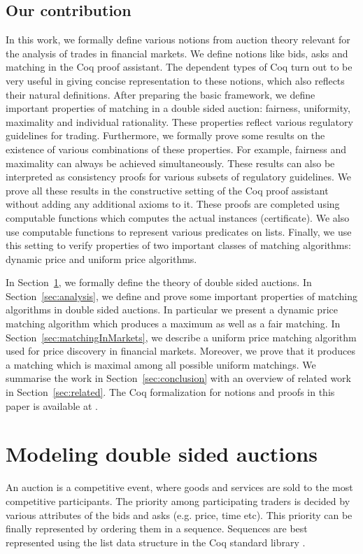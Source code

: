 \documentclass[a4paper,UKenglish,cleveref, autoref]{lipics-v2019}
\begin{document}
\subsection{Our contribution}

In this work, we formally define various notions from auction theory relevant for the analysis of trades in financial markets. We define notions like bids, asks and matching in the Coq proof assistant. The dependent types of Coq turn out to be very useful in giving concise representation to these notions, which also reflects their natural definitions. After preparing the basic framework, we define important properties of matching in a double sided auction: fairness, uniformity, maximality and individual rationality. These properties reflect various regulatory guidelines for trading. Furthermore, we formally prove some results on the existence of various combinations of these properties. For example, fairness and maximality can always be achieved simultaneously. These results can also be interpreted as consistency proofs for various subsets of regulatory guidelines. We prove all these results in the constructive setting of the Coq proof assistant without adding any additional axioms to it. These proofs are completed using computable functions which computes the actual instances (certificate). We also use computable functions to represent various predicates on lists. Finally, we use this setting to verify properties of two important classes of matching algorithms: dynamic price and uniform price algorithms. 

In Section~\ref{sec:modeling}, we formally define the theory of double sided auctions. In Section~\ref{sec:analysis}, we define and prove some important properties of matching algorithms in double sided auctions. In particular we present a dynamic price matching algorithm which produces a maximum as well as a fair matching. In Section~\ref{sec:matchingInMarkets}, we describe a uniform price matching algorithm used for price discovery in financial markets. Moreover, we prove that it produces a matching which is maximal among all possible uniform matchings. We summarise the work in Section~\ref{sec:conclusion} with an overview of related work in Section~\ref{sec:related}. The Coq formalization for notions and proofs in this paper is available at \cite{auctiongithub}.  

\section{Modeling double sided auctions}\label{sec:modeling}
An auction is a  competitive event, where goods and services are sold to the most competitive participants. The priority among participating traders is decided by various attributes of the bids and asks (e.g. price, time etc). This priority can be finally represented by ordering them in a sequence. Sequences are best represented using the list data structure in the Coq standard library \cite{standLib}.
\end{document}
